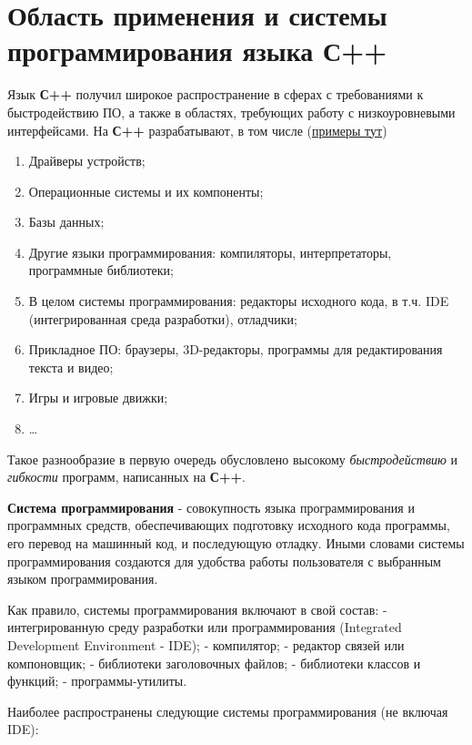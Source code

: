 \section{Область применения и системы программирования языка С++}

Язык \textbf{С++} получил широкое распространение в сферах с
требованиями к быстродействию ПО, а также в областях, требующих работу с
низкоуровневыми интерфейсами. На \textbf{С++} разрабатывают, в том числе
(\hyperref[examples_3]{примеры тут})
\begin{enumerate}
  \item Драйверы устройств;
  \item Операционные системы и их компоненты;
  \item Базы данных;
  \item Другие языки программирования: компиляторы, интерпретаторы,
  программные библиотеки;
  \item В целом системы программирования: редакторы
  исходного кода, в т.ч. IDE (интегрированная среда разработки),
  отладчики;
  \item Прикладное ПО: браузеры, 3D-редакторы, программы для
  редактирования текста и видео;
  \item Игры и игровые движки;
  \item \ldots{}
\end{enumerate}

Такое разнообразие в первую очередь обусловлено высокому
\emph{быстродействию} и \emph{гибкости} программ, написанных на
\textbf{С++}.

\textbf{Система программирования} - совокупность языка программирования
и программных средств, обеспечивающих подготовку исходного кода
программы, его перевод на машинный код, и последующую отладку. Иными
словами системы программирования создаются для удобства работы
пользователя с выбранным языком программирования.

Как правило, системы программирования включают в свой состав: -
интегрированную среду разработки или программирования (Integrated
Development Environment - IDE); - компилятор; - редактор связей или
компоновщик; - библиотеки заголовочных файлов; - библиотеки классов и
функций; - программы-утилиты.

Наиболее распространены следующие системы программирования (не включая
IDE):

